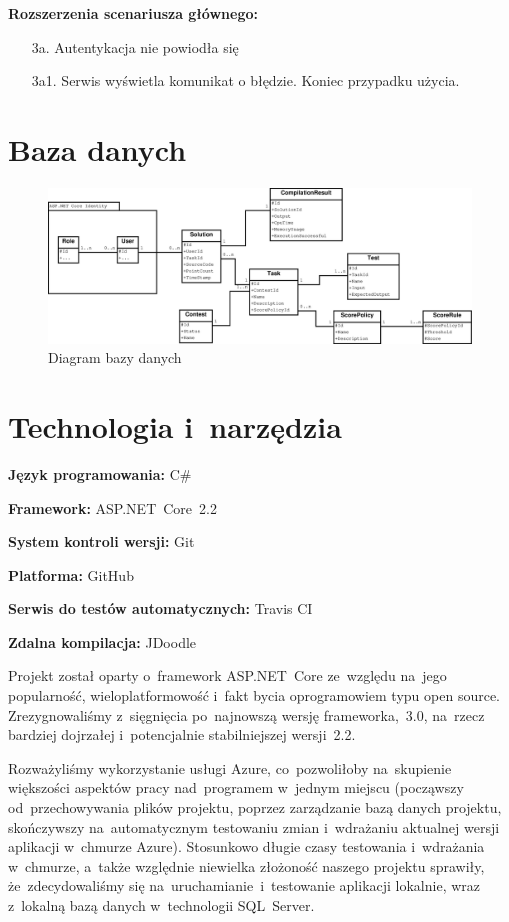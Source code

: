 \documentclass{article}
\begin{document}
\textbf{Rozszerzenia scenariusza głównego:}
\begin{itemize}
	\item[3a.] Autentykacja nie powiodła się
	\item[3a1.] Serwis wyświetla komunikat o błędzie. Koniec przypadku użycia.
\end{itemize}

\newpage
\section{Baza danych}

\begin{figure}[H]
	\includegraphics[width=\linewidth]{entityDiagram.eps}
	\caption{Diagram bazy danych}
\end{figure}

\section{Technologia i~narzędzia}

\textbf{Język programowania:} C\#

\textbf{Framework:} ASP.NET~Core~2.2

\textbf{System kontroli wersji:} Git

\textbf{Platforma:} GitHub

\textbf{Serwis do testów automatycznych:} Travis CI

\textbf{Zdalna kompilacja:} JDoodle

Projekt został oparty o~framework ASP.NET~Core ze~względu na~jego popularność, wieloplatformowość i~fakt bycia oprogramowiem typu open source. Zrezygnowaliśmy z~sięgnięcia po~najnowszą wersję frameworka,~3.0, na~rzecz bardziej dojrzałej i~potencjalnie stabilniejszej wersji~2.2.

Rozważyliśmy wykorzystanie usługi Azure, co~pozwoliłoby na~skupienie większości aspektów pracy nad~programem w~jednym miejscu (począwszy od~przechowywania plików projektu, poprzez zarządzanie bazą danych projektu, skończywszy na~automatycznym testowaniu zmian i~wdrażaniu aktualnej wersji aplikacji w~chmurze Azure). Stosunkowo długie czasy testowania i~wdrażania w~chmurze, a~także względnie niewielka złożoność naszego projektu sprawiły, że~zdecydowaliśmy się na~uruchamianie~i~testowanie aplikacji lokalnie, wraz z~lokalną bazą danych w~technologii SQL~Server.
\end{document}
